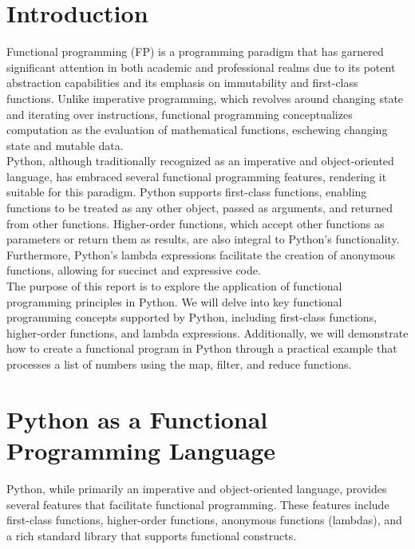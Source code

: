 \documentclass[a4paper]{article}
\begin{document}
\tableofcontents

\newpage
\section{Introduction}
Functional programming (FP) is a programming paradigm that has garnered significant attention in both academic and professional realms due to its potent abstraction capabilities and its emphasis on immutability and first-class functions. Unlike imperative programming, which revolves around changing state and iterating over instructions, functional programming conceptualizes computation as the evaluation of mathematical functions, eschewing changing state and mutable data.\\

Python, although traditionally recognized as an imperative and object-oriented language, has embraced several functional programming features, rendering it suitable for this paradigm. Python supports first-class functions, enabling functions to be treated as any other object, passed as arguments, and returned from other functions. Higher-order functions, which accept other functions as parameters or return them as results, are also integral to Python's functionality. Furthermore, Python's lambda expressions facilitate the creation of anonymous functions, allowing for succinct and expressive code.\\

The purpose of this report is to explore the application of functional programming principles in Python. We will delve into key functional programming concepts supported by Python, including first-class functions, higher-order functions, and lambda expressions. Additionally, we will demonstrate how to create a functional program in Python through a practical example that processes a list of numbers using the map, filter, and reduce functions.\\


\newpage
\section{Python as a Functional Programming Language}
Python, while primarily an imperative and object-oriented language, provides several features that facilitate functional programming. These features include first-class functions, higher-order functions, anonymous functions (lambdas), and a rich standard library that supports functional constructs.\\
\end{document}
